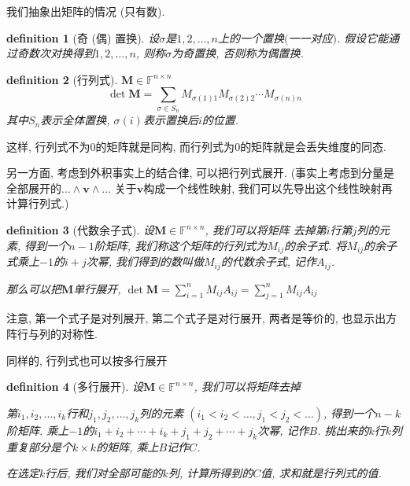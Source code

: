 \documentclass[12pt]{ctexbook}
\newtheorem{definition}{definition}
\numberwithin{definition}{section}
\numberwithin{theorem}{section}
\numberwithin{exercise}{section}
\numberwithin{example}{section}
\numberwithin{lemma}{section}
\begin{document}
    我们抽象出矩阵的情况 (只有数).

    \begin{definition}
        [奇 (偶) 置换] 设\(\sigma\)是\(1,2,\ldots,n\)上的一个置换\((\)一一对应\()\).
        假设它能通过奇数次对换得到\(1,2,\ldots,n\), 则称\(\sigma\)为奇置换, 否则称为偶置换.\footnotemark{}
    \end{definition}

    \begin{definition}
        [行列式] \(\mathbf{M} \in \mathbb{F}^{n \times n}\)
        \begin{equation}
            \det \mathbf{M} = \sum_{\sigma \in S_n} M_{\sigma(1)1} M_{\sigma(2)2} \cdots M_{\sigma(n)n}
        \end{equation}
        其中\(S_n\)表示全体置换, \(\sigma(i)\)表示置换后\(i\)的位置.
    \end{definition}

    这样, 行列式不为\(0\)的矩阵就是同构, 而行列式为\(0\)的矩阵就是会丢失维度的同态.

    另一方面, 考虑到外积事实上的结合律, 可以把行列式展开. (事实上考虑到分量是全部展开的\(\ldots \wedge \boldsymbol{v} \wedge \ldots\)
    关于\(\boldsymbol{v}\)构成一个线性映射, 我们可以先导出这个线性映射再计算行列式.)

    \begin{definition}
        [代数余子式] 设\(\mathbf{M} \in \mathbb{F}^{n \times n}\), 我们可以将矩阵
        去掉第\(i\)行第\(j\)列的元素, 得到一个\(n-1\)阶矩阵, 我们称这个矩阵的行列式为\(M_{ij}\)的余子式.
        将\(M_{ij}\)的余子式乘上\(- 1\)的\(i+j\)次幂, 我们得到的数叫做\(M_{ij}\)的代数余子式, 记作\(A_{ij}\).

        那么可以把\(\mathbf{M}\)单行展开, \(\det \mathbf{M} = \sum_{i=1}^{n} M_{ij}A_{ij} = \sum_{j=1}^{n} M_{ij}A_{ij}\)
    \end{definition}

    注意, 第一个式子是对列展开, 第二个式子是对行展开, 两者是等价的, 也显示出方阵行与列的对称性.

    同样的, 行列式也可以按多行展开

    \begin{definition}
        [多行展开] 设\(\mathbf{M} \in \mathbb{F}^{n \times n}\), 我们可以将矩阵去掉
        
        第\(i_{1},i_{2},\ldots,i_{k}\)行和\(j_{1},j_{2},\ldots,j_{k}\)列的元素 \((i_{1} < i_{2} < \ldots,j_{1} < j_{2} < \ldots)\), 得到一个\(n-k\)阶矩阵.
        乘上\(- 1\)的\(i_{1}+i_{2}+\cdots+i_{k}+j_{1}+j_{2}+\cdots+j_{k}\)次幂, 记作\(B\).
        挑出来的\(k\)行\(k\)列重复部分是个\(k \times k\)的矩阵, 乘上\(B\)记作\(C\).

        在选定\(k\)行后, 我们对全部可能的\(k\)列, 计算所得到的\(C\)值, 求和就是行列式的值.
    \end{definition}
\end{document}
